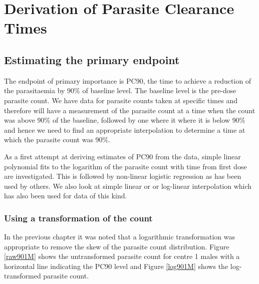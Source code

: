 \chapter{Derivation of Parasite Clearance Times}
\section{Estimating the primary endpoint}
The endpoint of primary importance is PC90, the time to achieve a reduction of the parasitaemia by 90\% of baseline level. The baseline level is the pre-dose parasite count. We have data for parasite counts taken at specific times and therefore will have a measurement of the parasite count at a time when the count was above 90\% of the baseline, followed by one where it where it is below 90\% and hence we need to find an appropriate interpolation to determine a time at which the parasite count was 90\%.

As a first attempt at deriving estimates of PC90 from the data, simple linear polynomial fits to the logarithm of the parasite count with time from first dose are investigated. This is followed by non-linear logistic regression as has been used by others\cite{wootton}. We also look at simple linear or or log-linear interpolation which has also been used for data of this kind\cite{carmello}.
\subsection{Using a transformation of the count}
In the previous chapter it was noted that a logarithmic transformation was appropriate to remove the skew of the parasite count distribution. Figure \ref{raw901M} shows the untransformed parasite count for centre 1 males with a horizontal line indicating the PC90 level and Figure \ref{log901M} shows the log-transformed parasite count.

